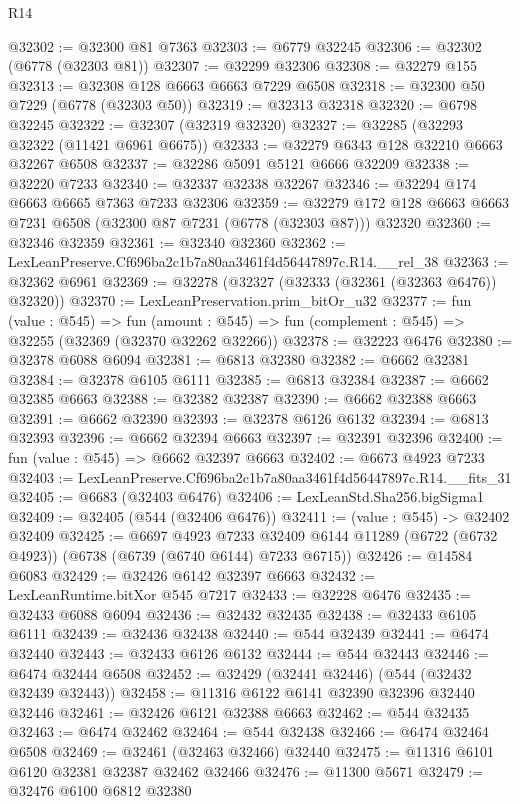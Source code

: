 \begin{lexlean}{R14}
\begin{coremodule}
@32302 := @32300 @81 @7363
@32303 := @6779 @32245
@32306 := @32302 (@6778 (@32303 @81))
@32307 := @32299 @32306
@32308 := @32279 @155
@32313 := @32308 @128 @6663 @6663 @7229 @6508
@32318 := @32300 @50 @7229 (@6778 (@32303 @50))
@32319 := @32313 @32318
@32320 := @6798 @32245
@32322 := @32307 (@32319 @32320)
@32327 := @32285 (@32293 @32322 (@11421 @6961 @6675))
@32333 := @32279 @6343 @128 @32210 @6663 @32267 @6508
@32337 := @32286 @5091 @5121 @6666 @32209
@32338 := @32220 @7233
@32340 := @32337 @32338 @32267
@32346 := @32294 @174 @6663 @6665 @7363 @7233 @32306
@32359 := @32279 @172 @128 @6663 @6663 @7231 @6508 (@32300 @87 @7231 (@6778 (@32303 @87))) @32320
@32360 := @32346 @32359
@32361 := @32340 @32360
@32362 := LexLeanPreserve.Cf696ba2c1b7a80aa3461f4d56447897c.R14.__rel_38
@32363 := @32362 @6961
@32369 := @32278 (@32327 (@32333 (@32361 (@32363 @6476)) @32320))
@32370 := LexLeanPreservation.prim_bitOr_u32
@32377 := fun (value : @545) =>
  fun (amount : @545) => fun (complement : @545) => @32255 (@32369 (@32370 @32262 @32266))
@32378 := @32223 @6476
@32380 := @32378 @6088 @6094
@32381 := @6813 @32380
@32382 := @6662 @32381
@32384 := @32378 @6105 @6111
@32385 := @6813 @32384
@32387 := @6662 @32385 @6663
@32388 := @32382 @32387
@32390 := @6662 @32388 @6663
@32391 := @6662 @32390
@32393 := @32378 @6126 @6132
@32394 := @6813 @32393
@32396 := @6662 @32394 @6663
@32397 := @32391 @32396
@32400 := fun (value : @545) => @6662 @32397 @6663
@32402 := @6673 @4923 @7233
@32403 := LexLeanPreserve.Cf696ba2c1b7a80aa3461f4d56447897c.R14.__fits_31
@32405 := @6683 (@32403 @6476)
@32406 := LexLeanStd.Sha256.bigSigma1
@32409 := @32405 (@544 (@32406 @6476))
@32411 := (value : @545) -> @32402 @32409
@32425 := @6697
    @4923
    @7233
    @32409
    @6144
    @11289
    (@6722 (@6732 @4923))
    (@6738 (@6739 (@6740 @6144) @7233 @6715))
@32426 := @14584 @6083
@32429 := @32426 @6142 @32397 @6663
@32432 := LexLeanRuntime.bitXor @545 @7217
@32433 := @32228 @6476
@32435 := @32433 @6088 @6094
@32436 := @32432 @32435
@32438 := @32433 @6105 @6111
@32439 := @32436 @32438
@32440 := @544 @32439
@32441 := @6474 @32440
@32443 := @32433 @6126 @6132
@32444 := @544 @32443
@32446 := @6474 @32444 @6508
@32452 := @32429 (@32441 @32446) (@544 (@32432 @32439 @32443))
@32458 := @11316 @6122 @6141 @32390 @32396 @32440 @32446
@32461 := @32426 @6121 @32388 @6663
@32462 := @544 @32435
@32463 := @6474 @32462
@32464 := @544 @32438
@32466 := @6474 @32464 @6508
@32469 := @32461 (@32463 @32466) @32440
@32475 := @11316 @6101 @6120 @32381 @32387 @32462 @32466
@32476 := @11300 @5671
@32479 := @32476 @6100 @6812 @32380

\end{coremodule}
\end{lexlean}
